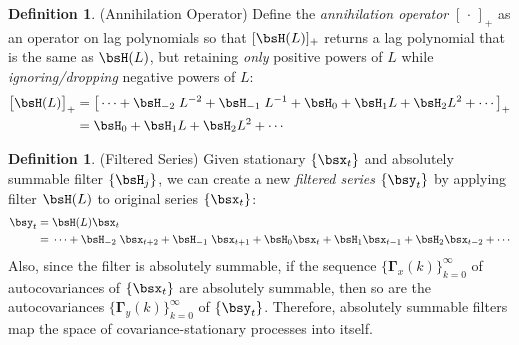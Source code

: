 \documentclass[12pt]{article}
\theoremstyle{plain}
\theoremstyle{definition}
\newtheorem{defn}[thm]{Definition}
\theoremstyle{remark}
\newcommand{\bsGamma}{\boldsymbol{\Gamma}}
\begin{document}
\begin{defn}(Annihilation Operator)
Define the \emph{annihilation operator} $[\,\cdot\,]_+$ as an operator
on lag polynomials so that $[\bsH(L)]_+$ returns a lag polynomial that
is the same as $\bsH(L)$, but retaining \emph{only} positive powers of
$L$ while \emph{ignoring/dropping} negative powers of $L$:
\begin{align*}
  \big[\bsH(L)\big]_+
  &=
  \big[
    \cdots + \bsH_{-2}\;L^{-2} + \bsH_{-1}\;L^{-1} +
    \bsH_0 + \bsH_1 L + \bsH_2L^2 + \cdots
  \big]_+
  \\
  &=
  \bsH_0 + \bsH_1 L + \bsH_2L^2 + \cdots
\end{align*}
\end{defn}

\begin{defn}(Filtered Series)
Given stationary $\{\bsx_t\}$ and absolutely summable filter
$\{\bsH_j\}$,
we can create a new \emph{filtered series} $\{\bsy_t\}$ by applying
filter $\bsH(L)$ to original series $\{\bsx_t\}$:
\begin{align*}
  \bsy_t =&\; \bsH(L)\bsx_t
  \\
  =&\; \cdots + \bsH_{-2}\;\bsx_{t+2} + \bsH_{-1}\;\bsx_{t+1} +
  \bsH_0\bsx_t + \bsH_1 \bsx_{t-1} + \bsH_2\bsx_{t-2} + \cdots
\end{align*}
Also, since the filter is absolutely summable,
if the sequence $\{\bsGamma_x(k)\}_{k=0}^\infty$ of
autocovariances of $\{\bsx_t\}$ are absolutely
summable, then so are the autocovariances
$\{\bsGamma_y(k)\}_{k=0}^\infty$ of $\{\bsy_t\}$.
Therefore, absolutely summable filters map the space of
covariance-stationary processes into itself.
\end{defn}
\end{document}
